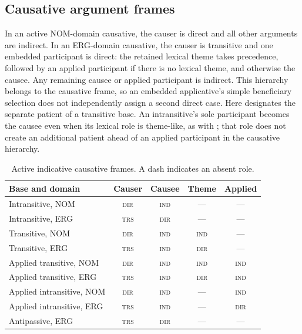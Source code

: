 \subsection{Causative argument frames}

In an active NOM-domain causative, the causer is direct and all other arguments
are indirect. In an ERG-domain causative, the causer is transitive and one
embedded participant is direct: the retained lexical theme takes precedence,
followed by an applied participant if there is no lexical theme, and otherwise
the causee. Any remaining causee or applied participant is indirect. This
hierarchy belongs to the causative frame, so an embedded applicative's simple
beneficiary selection does not independently assign a second direct case.
Here  designates the separate patient of a transitive
base. An intransitive's sole participant becomes the causee even when its
lexical role is theme-like, as with  ; that role
does not create an additional patient ahead of an applied participant in the
causative hierarchy.

\begin{table}[htbp]
\footnotesize
\caption{Active indicative causative frames. A dash indicates an absent role.}
\label{tab:causative-frames}
\begin{tabularx}{\textwidth}{L C C C C}
\toprule
Base and domain & Causer & Causee & Theme & Applied \\
\midrule
Intransitive, NOM & \textsc{dir} & \textsc{ind} & --- & --- \\
Intransitive, ERG & \textsc{trs} & \textsc{dir} & --- & --- \\
Transitive, NOM & \textsc{dir} & \textsc{ind} & \textsc{ind} & --- \\
Transitive, ERG & \textsc{trs} & \textsc{ind} & \textsc{dir} & --- \\
Applied transitive, NOM & \textsc{dir} & \textsc{ind} & \textsc{ind} & \textsc{ind} \\
Applied transitive, ERG & \textsc{trs} & \textsc{ind} & \textsc{dir} & \textsc{ind} \\
Applied intransitive, NOM & \textsc{dir} & \textsc{ind} & --- & \textsc{ind} \\
Applied intransitive, ERG & \textsc{trs} & \textsc{ind} & --- & \textsc{dir} \\
Antipassive, ERG & \textsc{trs} & \textsc{dir} & --- & --- \\
\bottomrule
\end{tabularx}
\end{table}

